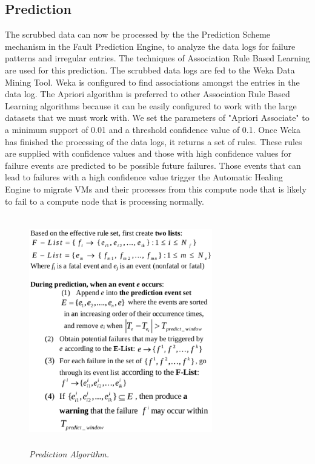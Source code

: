 \subsection{Prediction}
The scrubbed data can now be processed by the the Prediction Scheme mechanism in the Fault Prediction Engine, to analyze the data logs for failure patterns and irregular entries. The techniques of Association Rule Based Learning are used for this prediction. The scrubbed data logs are fed to the Weka Data Mining Tool.\cite{WEKA} Weka is configured to find associations amongst the entries in the data log. The Apriori algorithm is preferred to other Association Rule Based Learning algorithms because it can be easily configured to work with the large datasets that we must work with.\cite{APRIORI_1}\cite{APRIORI_2} We set the parameters of "Apriori Associate" to a minimum support of 0.01 and a threshold confidence value of 0.1. Once Weka has finished the processing of the data logs, it returns a set of rules. These rules are supplied with confidence values and those with high confidence values for failure events are predicted to be possible future failures. Those events that can lead to failures with a high confidence value trigger the Automatic Healing Engine to migrate VMs and their processes from this compute node that is likely to fail to a compute node that is processing normally.
\begin{figure}[t]
		\begin{center}
			\includegraphics[width=8cm,height=10cm]{figures/prediction_algorithm.eps} 
			\caption{\small \sl Prediction Algorithm.\label{fig:Label8}} 
		\end{center} 
	\end{figure}
